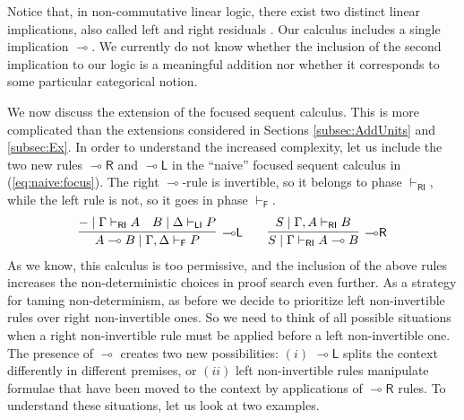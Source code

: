 \documentclass[submission,copyright,creativecommons]{eptcs}
\theoremstyle{definition}
\newcommand{\lright}{{\multimap}\mathsf{R}}
\newcommand{\lleft}{{\multimap}\mathsf{L}}
\newcommand{\lolli}{\multimap}
\newcommand{\RI}{\mathsf{RI}}
\newcommand{\LI}{\mathsf{LI}}
\newcommand{\F}{\mathsf{F}}
\begin{document}
Notice that, in non-commutative linear logic, there exist two distinct linear implications, also called left and right residuals \cite{lambek:mathematics:58}. Our calculus includes a single implication $\lolli$. We currently do not know whether the inclusion of the second implication to our logic is a meaningful addition nor whether it corresponds to some particular categorical notion. 

We now discuss the extension of the focused sequent calculus. This is more complicated than the extensions considered in Sections \ref{subsec:AddUnits} and \ref{subsec:Ex}. In order to understand the increased complexity, let us include the two new rules $\lright$ and $\lleft$ in the ``naive'' focused sequent calculus in (\ref{eq:naive:focus}). The right $\lolli$-rule is invertible, so it belongs to phase $\vdash_\RI$, while the left rule is not, so it goes in phase $\vdash_\F$.
\begin{displaymath}
  \begin{array}{c}
    \infer[\lleft]{A \lolli B \mid \Gamma , \Delta \vdash_\F P}{
      - \mid \Gamma \vdash_\RI A
      &
      B \mid \Delta \vdash_\LI P
    }
    \qquad
    \infer[\lright]{S \mid \Gamma \vdash_\RI A \lolli B}{S \mid \Gamma , A \vdash_\RI B}
  \end{array}
\end{displaymath}
As we know, this calculus is too permissive, and the inclusion of the above rules increases the non-deterministic choices in proof search even further. As a strategy for taming non-determinism, as before we  decide to prioritize left non-invertible rules over right non-invertible ones. So we need to think of all possible situations when a right non-invertible rule must be applied before a left non-invertible one. The presence of $\lolli$ creates two new possibilities: $(i)$ $\lleft$ splits the context differently in different premises, or $(ii)$ left non-invertible rules manipulate formulae that have been moved to the context by applications of $\lright$ rules. To understand these situations, let us look at two examples.
\end{document}

